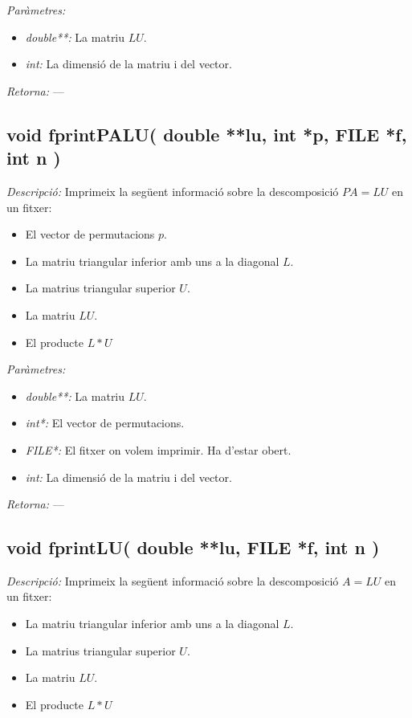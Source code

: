 \documentclass[a4paper,10pt, notitlepage]{article}
\begin{document}
\textit{Paràmetres: }\begin{itemize}[label={--}]
  \item \textit{double**: } La matriu $LU$.
  \item \textit{int: } La dimensió de la matriu i del vector.
\end{itemize}
\textit{Retorna: } ---



\subsection{void fprintPALU( double **lu, int *p, FILE *f, int n )}
\textit{Descripció: }
  Imprimeix la següent informació sobre la descomposició $PA=LU$ en un fitxer:
  \begin{itemize}
   \item El vector de permutacions $p$.
   \item La matriu triangular inferior amb uns a la diagonal $L$.
   \item La matrius triangular superior $U$.
   \item La matriu $LU$.
   \item El producte $L*U$
  \end{itemize}

\textit{Paràmetres: }\begin{itemize}[label={--}]
  \item \textit{double**: } La matriu $LU$.
  \item \textit{int*: } El vector de permutacions.
  \item \textit{FILE*: } El fitxer on volem imprimir. Ha d'estar obert.
  \item \textit{int: } La dimensió de la matriu i del vector.
\end{itemize}
\textit{Retorna: } ---



\subsection{void fprintLU( double **lu, FILE *f, int n )}
\textit{Descripció: }
  Imprimeix la següent informació sobre la descomposició $A=LU$ en un fitxer:
  \begin{itemize}
   \item La matriu triangular inferior amb uns a la diagonal $L$.
   \item La matrius triangular superior $U$.
   \item La matriu $LU$.
   \item El producte $L*U$
  \end{itemize}
\end{document}
